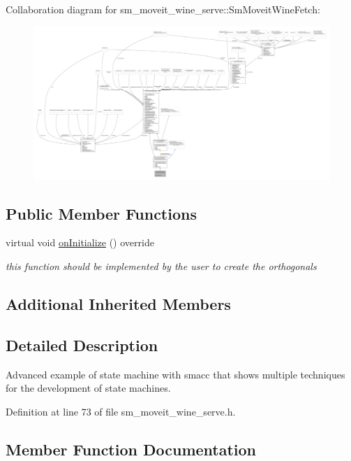 Collaboration diagram for sm\+\_\+moveit\+\_\+wine\+\_\+serve\+:\+:Sm\+Moveit\+Wine\+Fetch\+:
\nopagebreak
\begin{figure}[H]
\begin{center}
\leavevmode
\includegraphics[width=350pt]{structsm__moveit__wine__serve_1_1SmMoveitWineFetch__coll__graph}
\end{center}
\end{figure}
\subsection*{Public Member Functions}
\begin{DoxyCompactItemize}
\item 
virtual void \hyperlink{structsm__moveit__wine__serve_1_1SmMoveitWineFetch_a4e6181a4730142e0a2ec6ae2e077bbb7}{on\+Initialize} () override
\begin{DoxyCompactList}\small\item\em this function should be implemented by the user to create the orthogonals \end{DoxyCompactList}\end{DoxyCompactItemize}
\subsection*{Additional Inherited Members}


\subsection{Detailed Description}
Advanced example of state machine with smacc that shows multiple techniques for the development of state machines. 

Definition at line 73 of file sm\+\_\+moveit\+\_\+wine\+\_\+serve.\+h.



\subsection{Member Function Documentation}
\mbox{\label{structsm__moveit__wine__serve_1_1SmMoveitWineFetch_a4e6181a4730142e0a2ec6ae2e077bbb7}} 
